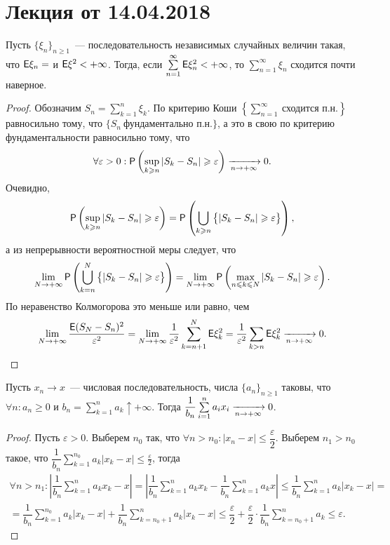 \section{Лекция от 14.04.2018}
\begin{theorem}
	Пусть $\{\xi_n \}_{n \geqslant 1}$~--- последовательность независимых случайных величин такая, что $\E \xi_n = $ и $\E \xi^2 < +\infty$. Тогда, если $\sum\limits_{n = 1}^{\infty} \E \xi_n^2 < +\infty$, то $ \sum\limits_{n = 1}^{\infty} \xi_n$ сходится почти наверное.
	\begin{proof}
		Обозначим $S_n = \sum\limits_{k=1}^n \xi_k$. По критерию Коши $\left\{ \sum\limits_{n = 1}^{\infty}~\text{сходится п.н.} \right\}$ равносильно тому, что $\{ S_n~\text{фундаментально п.н.}\}$, а это в свою по критерию фундаментальности равносильно тому, что 
		$$\forall \varepsilon > 0: \P \left( \sup\limits_{k \geqslant n} | S_k - S_n | \geqslant \varepsilon \right) \limn 0.$$
		 Очевидно,
		 $$\P \left( \sup\limits_{k \geqslant n} | S_k - S_n | \geqslant \varepsilon \right) = \P \left( \bigcup\limits_{k \geqslant n} \big\{| S_k - S_n | \geqslant \varepsilon \big\} \right),$$
		 а из непрерывности вероятностной меры следует, что 
		 $$\lim\limits_{N \rightarrow +\infty} \P \left( \bigcup\limits_{k = n}^{N} \big\{| S_k - S_n | \geqslant \varepsilon \big\} \right) = \lim\limits_{N \rightarrow +\infty} \P \left( \max\limits_{n \leqslant k \leqslant N} | S_k - S_n | \geqslant \varepsilon \right).$$
		 По неравенство Колмогорова это меньше или равно, чем
		 $$\lim\limits_{N \rightarrow + \infty} \dfrac{\E ( S_N - S_n)^2}{\varepsilon^2} = \lim\limits_{N \rightarrow + \infty} \dfrac{1}{\varepsilon^2} \sum\limits_{k = n + 1}^N \E \xi_k^2 = \dfrac{1}{\varepsilon^2} \sum\limits_{k > n} \E \xi_k^2 \limn 0.$$
	\end{proof}
\end{theorem}
\begin{lemma}[Тёплица]
	Пусть $x_n \rightarrow x$~--- числовая последовательность, числа $\{a_n\}_{n \geqslant 1}$ таковы, что $ \forall n: a_n \geqslant 0$ и $ b_n = \sum\limits_{k = 1}^n a_k \uparrow +\infty$. Тогда $\dfrac{1}{b_n} \sum\limits_{i = 1}^n a_i x_i \limn 0$.
	\begin{proof}
		Пусть $\varepsilon > 0$. Выберем $n_0$ так, что $\forall n > n_0: |x_n - x| \leqslant \dfrac{\varepsilon}{2}$. Выберем $n_1 > n_0$ такое, что $\dfrac{1}{b_n} \sum\limits_{k=1}^{n_0} a_k | x_k - x| \leqslant \frac{\varepsilon}{2}$, тогда
		\begin{multline*}
			\forall n > n_1: \left| \dfrac{1}{b_n} \sum\limits_{k = 1}^n a_k x_k - x \right| = \left| \dfrac{1}{b_n} \sum\limits_{k = 1}^n a_k x_k - \dfrac{1}{b_n} \sum\limits_{k = 1}^n a_k x \right| \leqslant \dfrac{1}{b_n} \sum\limits_{k = 1}^n a_k |x_k - x| = \\= \dfrac{1}{b_n} \sum\limits_{k = 1}^{n_0} a_k |x_k - x| + \dfrac{1}{b_n} \sum\limits_{k = n_0 + 1}^n a_k |x_k - x| \leqslant \dfrac{\varepsilon}{2} + \dfrac{\varepsilon}{2} \cdot \dfrac{1}{b_n} \sum\limits_{k = n_0 + 1}^n a_k \leqslant \varepsilon.
		\end{multline*}
	\end{proof}
\end{lemma}
